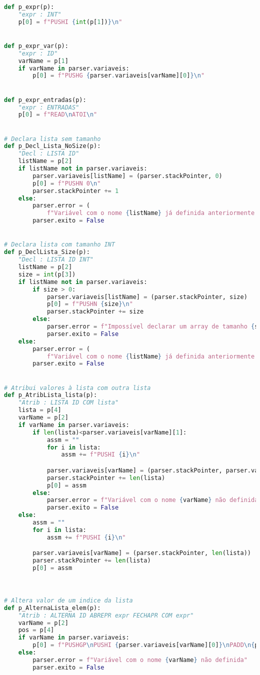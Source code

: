 \documentclass[11pt,a4paper]{report}%
\begin{document}
\begin{scriptsize}
\begin{lstlisting}[language=python]
def p_expr(p):
    "expr : INT"
    p[0] = f"PUSHI {int(p[1])}\n"


def p_expr_var(p):
    "expr : ID"
    varName = p[1]
    if varName in parser.variaveis:
        p[0] = f"PUSHG {parser.variaveis[varName][0]}\n"


def p_expr_entradas(p):
    "expr : ENTRADAS"
    p[0] = f"READ\nATOI\n"


# Declara lista sem tamanho
def p_Decl_Lista_NoSize(p):
    "Decl : LISTA ID"
    listName = p[2]
    if listName not in parser.variaveis:
        parser.variaveis[listName] = (parser.stackPointer, 0)
        p[0] = f"PUSHN 0\n"
        parser.stackPointer += 1
    else:
        parser.error = (
            f"Variável com o nome {listName} já definida anteriormente.")
        parser.exito = False


# Declara lista com tamanho INT
def p_DeclLista_Size(p):
    "Decl : LISTA ID INT"
    listName = p[2]
    size = int(p[3])
    if listName not in parser.variaveis:
        if size > 0:
            parser.variaveis[listName] = (parser.stackPointer, size)
            p[0] = f"PUSHN {size}\n"
            parser.stackPointer += size
        else:
            parser.error = f"Impossível declarar um array de tamanho {size}"
            parser.exito = False
    else:
        parser.error = (
            f"Variável com o nome {listName} já definida anteriormente.")
        parser.exito = False


# Atribui valores à lista com outra lista
def p_AtribLista_lista(p):
    "Atrib : LISTA ID COM lista"
    lista = p[4]
    varName = p[2]
    if varName in parser.variaveis:
        if len(lista)<parser.variaveis[varName][1]:
            assm = ""
            for i in lista:
                assm += f"PUSHI {i}\n"

            parser.variaveis[varName] = (parser.stackPointer, parser.variaveis[varName][1])
            parser.stackPointer += len(lista)
            p[0] = assm
        else:
            parser.error = f"Variável com o nome {varName} não definida"
            parser.exito = False
    else:
        assm = ""
        for i in lista:
            assm += f"PUSHI {i}\n"

        parser.variaveis[varName] = (parser.stackPointer, len(lista))
        parser.stackPointer += len(lista)
        p[0] = assm



# Altera valor de um indice da lista
def p_AlternaLista_elem(p):
    "Atrib : ALTERNA ID ABREPR expr FECHAPR COM expr"
    varName = p[2]
    pos = p[4]
    if varName in parser.variaveis:
        p[0] = f"PUSHGP\nPUSHI {parser.variaveis[varName][0]}\nPADD\n{p[4]}{p[7]}STOREN\n"
    else:
        parser.error = f"Variável com o nome {varName} não definida"
        parser.exito = False



\end{lstlisting}
\end{scriptsize}
\end{document}
